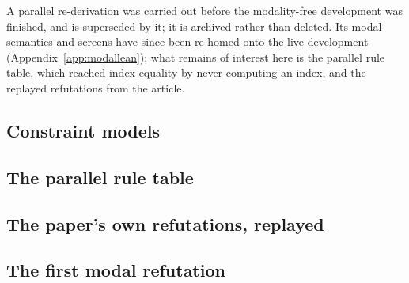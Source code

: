 \documentclass[11pt,a4paper]{article}
\begin{document}
A parallel re-derivation was carried out before the modality-free
development was finished, and is superseded by it; it is archived rather
than deleted. Its modal semantics and screens have since been re-homed onto the live
development (Appendix~\ref{app:modallean}); what remains of interest here
is the parallel rule table, which reached index-equality by never
computing an index, and the replayed refutations from the article.

\subsection{Constraint models}


\subsection{The parallel rule table}


\subsection{The paper's own refutations, replayed}


\subsection{The first modal refutation}

\end{document}

